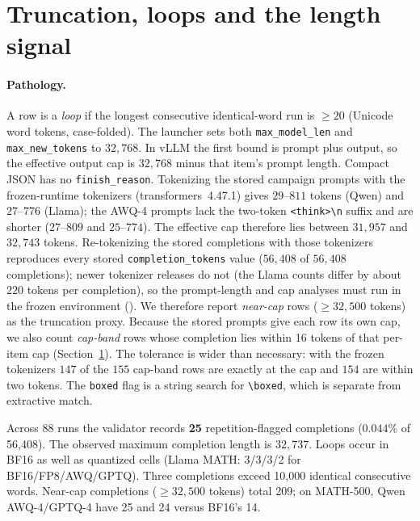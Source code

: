 \documentclass[11pt,a4paper]{article}
\begin{document}
\FloatBarrier
\section{Truncation, loops and the length signal}
\label{sec:pathology}
\paragraph{Pathology.}
A row is a \emph{loop} if the longest consecutive identical-word run is $\ge 20$ (Unicode word tokens, case-folded). The launcher sets both \texttt{max\_model\_len} and \texttt{max\_new\_tokens} to $32{,}768$. In vLLM the first bound is prompt plus output, so the effective output cap is $32{,}768$ minus that item's prompt length. Compact JSON has no \texttt{finish\_reason}. Tokenizing the stored campaign prompts with the frozen-runtime tokenizers (transformers~4.47.1) gives $29$--$811$ tokens (Qwen) and $27$--$776$ (Llama); the AWQ-4 prompts lack the two-token \texttt{<think>\textbackslash n} suffix and are shorter ($27$--$809$ and $25$--$774$). The effective cap therefore lies between $31{,}957$ and $32{,}743$ tokens. Re-tokenizing the stored completions with those tokenizers reproduces every stored \texttt{completion\_tokens} value ($56{,}408$ of $56{,}408$ completions); newer tokenizer releases do not (the Llama counts differ by about $220$ tokens per completion), so the prompt-length and cap analyses must run in the frozen environment (). We therefore report \emph{near-cap} rows ($\ge 32{,}500$ tokens) as the truncation proxy. Because the stored prompts give each row its own cap, we also count \emph{cap-band} rows whose completion lies within 16 tokens of that per-item cap (Section~\ref{sec:pathology}). The tolerance is wider than necessary: with the frozen tokenizers $147$ of the $155$ cap-band rows are exactly at the cap and $154$ are within two tokens. The \texttt{boxed} flag is a string search for \texttt{\textbackslash boxed}, which is separate from extractive match.

Across 88 runs the validator records \textbf{25} repetition-flagged completions ($0.044\%$ of 56{,}408). The observed maximum completion length is $32{,}737$. Loops occur in BF16 as well as quantized cells (Llama MATH: 3/3/3/2 for BF16/FP8/AWQ/GPTQ). Three completions exceed 10{,}000 identical consecutive words. Near-cap completions ($\ge 32{,}500$ tokens) total 209; on MATH-500, Qwen AWQ-4/GPTQ-4 have 25 and 24 versus BF16's 14.
\end{document}
